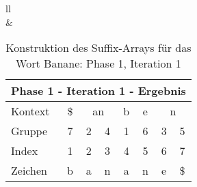 \begin{table}[H]
\begin{adjustbox}{max width=\textwidth}
\begin{tabular}{ll}
\\
&
\\

\begin{tabular}{lccccccc}
\multicolumn{8}{l}{Phase 1 - Iteration 1 - Ergebnis}                                                                                                                                                          \\ \hline
\multicolumn{1}{l|}{Kontext} & \multicolumn{1}{c|}{\$} & \multicolumn{2}{c|}{\cellcolor[HTML]{\yellow}an}                            & \multicolumn{1}{c|}{b} & \multicolumn{1}{c|}{e} & \multicolumn{2}{c}{n} \\
\multicolumn{1}{l|}{Gruppe}  & \multicolumn{1}{c|}{7}  & \cellcolor[HTML]{\yellow}2 & \multicolumn{1}{c|}{\cellcolor[HTML]{\yellow}4} & \multicolumn{1}{c|}{1} & \multicolumn{1}{c|}{6} & 3         & 5         \\ \hline
\multicolumn{1}{l|}{Index}   & 1                       & 2                         & 3                                              & 4                      & 5                      & 6         & 7         \\
\multicolumn{1}{l|}{Zeichen} & b                       & a                         & n                                              & a                      & n                      & e         & \$       
\end{tabular}

\end{tabular}
\end{adjustbox}

\caption[Konstruktion des Suffix-Arrays für das Wort Banane: Phase 1, Iteration 1]{Konstruktion des Suffix-Arrays für das Wort Banane: Phase 1, Iteration 1}
\label{fig_banane_1_1} 
\end{table}
